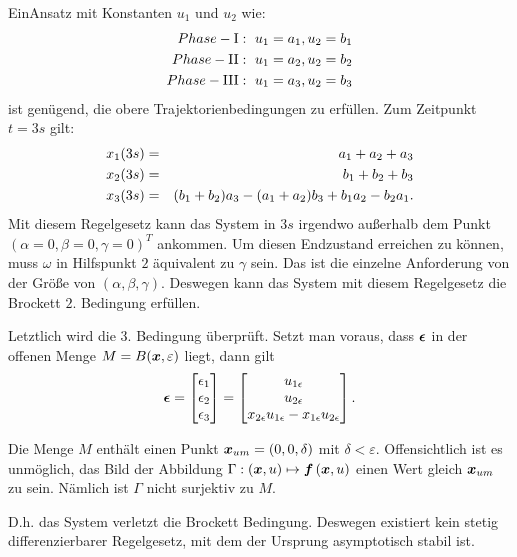 \begin{beispiel}
   EinAnsatz mit Konstanten $u_{1}$ und $u_{2}$ wie:
   \begin{eqnarray}
   Phase-\textrm{I}:~u_{1} = a_{1}, u_{2} = b_{1}\notag\\
   Phase-\textrm{II}:~u_{1} = a_{2}, u_{2} = b_{2}\notag\\
   Phase-\textrm{III}:~u_{1} = a_{3}, u_{2} = b_{3}
   \end{eqnarray}
   ist genügend, die obere Trajektorienbedingungen zu erfüllen.
   Zum Zeitpunkt $t=3s$ gilt:
   \begin{eqnarray}
   x_{1}(3s) &=& a_{1}  +a_{2} + a_{3}\notag\\
   x_{2}(3s) &=& b_{1} + b_{2} + b_{3}\notag\\
   x_{3}(3s) &=& (b_{1} + b_{2})a_{3} - (a_{1} + a_{2})b_{3} + b_{1}a_{2} - b_{2}a_{1}.
   \end{eqnarray}
   Mit diesem Regelgesetz kann das System in $3s$ irgendwo außerhalb dem Punkt $(\alpha=0,\beta=0,\gamma=0)^{T}$ ankommen. Um diesen Endzustand erreichen zu können, muss $\omega$ in Hilfspunkt $2$ äquivalent zu $\gamma$ sein. Das ist die einzelne Anforderung von der Größe von $(\alpha,\beta,\gamma)$. Deswegen kann das System mit diesem Regelgesetz die Brockett $2.$ Bedingung erfüllen.
  
   Letztlich wird die 3. Bedingung überprüft. Setzt man voraus, dass $\boldsymbol \epsilon$ in der offenen Menge $M=B(\boldsymbol x,\varepsilon)$ liegt, dann gilt 
   \begin{eqnarray}
   \boldsymbol \epsilon  = \begin{bmatrix}
   \epsilon _{1}\\ \epsilon_{2} \\ \epsilon_{3}
   \end{bmatrix} = 
   \begin{bmatrix}
   u_{1\epsilon }\\ u_{2\epsilon } \\ x_{2\epsilon}u_{1\epsilon}- x_{1\epsilon}u_{2\epsilon}
   \end{bmatrix}.
   \label{eq:doppel_Brockett}
   \end{eqnarray}
  
   Die Menge $M$ enthält einen Punkt $\boldsymbol x_{um}=(0,0,\delta)$ mit $\delta<\varepsilon$. Offensichtlich ist es unmöglich, das Bild der Abbildung $\Gamma: \left ( \boldsymbol x,u \right ) \mapsto \boldsymbol f\left ( \boldsymbol x,u \right )$ einen Wert gleich $\boldsymbol x_{um}$ zu sein. Nämlich ist $\Gamma$ nicht surjektiv zu $M$.
  
   D.h. das System verletzt die Brockett Bedingung. Deswegen existiert kein stetig differenzierbarer Regelgesetz, mit dem der Ursprung asymptotisch stabil ist.
\end{beispiel}
 
